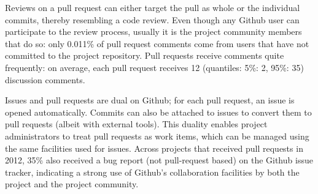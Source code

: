 \documentclass{acm_proc_article-sp}
\begin{document}
Reviews on a pull request can either target the pull as whole or the individual commits,
thereby resembling a code review. 
Even though any Github user can participate to the
review process, usually it is the project community members that do so:
only 0.011\% of pull request comments come from users that have not
committed to the project repository.
Pull requests receive comments quite frequently: on average, each pull
request receives 12 (quantiles: 5\%: 2, 95\%: 35) discussion comments.

Issues and pull requests are dual on Github; for each pull request, an issue is
opened automatically. Commits can also be attached to issues to convert them to
pull requests (albeit with external tools). This duality enables project
administrators to treat pull requests as work items, which can be managed using
the same facilities used for issues. Across projects that received pull
requests in 2012, 35\% also received a bug report (not pull-request based) 
on the Github issue tracker, indicating a strong use of Github's collaboration
facilities by both the project and the project community.

%
\end{document}
